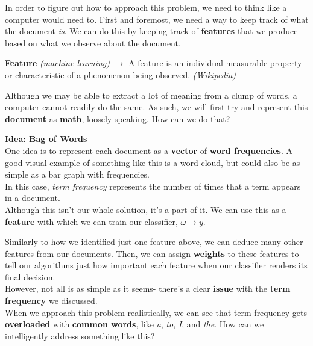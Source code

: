 \documentclass[english, 10pt]{article}
\begin{document}
\hfill \break In order to figure out how to approach this problem, we need to think like a computer would need to. First and foremost, we need a way to keep track of what the document \textit{is}. We can do this by keeping track of \textbf{features} that we produce based on what we observe about the document.\\

\begin{tcolorbox}[title=Definition:,colframe=red!75!black,colback=red!5!white,arc=0pt,fonttitle=\bfseries]
\textbf{Feature} \textit{(machine learning)} $\rightarrow$ A feature is an individual measurable property or characteristic of a phenomenon being observed. \textit{(Wikipedia)}
\end{tcolorbox}


\hfill \break Although we may be able to extract a lot of meaning from a clump of words, a computer cannot readily do the same. As such, we will first try and represent this \textbf{document} as \textbf{math}, loosely speaking. How can we do that?\\


\begin{myproof}
\textbf{Idea: Bag of Words}\\
One idea is to represent each document as a \textbf{vector} of \textbf{word frequencies}. A good visual example of something like this is a word cloud, but could also be as simple as a bar graph with frequencies.\\

In this case, \textit{term frequency} represents the number of times that a term appears in a document.\\

Although this isn't our whole solution, it's a part of it. We can use this as a \textbf{feature} with which we can train our classifier, $\omega \rightarrow y$.
\end{myproof}

\hfill \break Similarly to how we identified just one feature above, we can deduce many other features from our documents. Then, we can assign \textbf{weights} to these features to tell our algorithms just how important each feature when our classifier renders its final decision.\\

However, not all is as simple as it seems- there's a clear \textbf{issue} with the \textbf{term frequency} we discussed.\\

When we approach this problem realistically, we can see that term frequency gets \textbf{overloaded} with \textbf{common words}, like \textit{a}, \textit{to}, \textit{I}, and \textit{the}. How can we intelligently address something like this?
\end{document}
